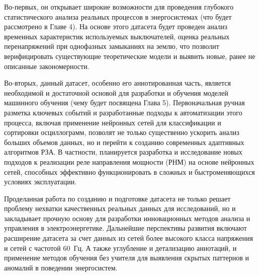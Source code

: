 Во-первых, он открывает широкие возможности для проведения глубокого статистического анализа реальных процессов в энергосистемах (что будет рассмотрено в Главе 4). На основе этого датасета будет проведен анализ временных характеристик используемых выключателей, оценка реальных перенапряжений при однофазных замыканиях на землю, что позволит верифицировать существующие теоретические модели и выявить новые, ранее не описанные закономерности.

Во-вторых, данный датасет, особенно его аннотированная часть, является необходимой и достаточной основой для разработки и обучения моделей машинного обучения (чему будет посвящена Глава 5). Первоначальная ручная разметка ключевых событий и разработанные подходы к автоматизации этого процесса, включая применение нейронных сетей для классификации и сортировки осциллограмм, позволят не только существенно ускорить анализ больших объемов данных, но и перейти к созданию современных адаптивных алгоритмов РЗА. В частности, планируется разработка и исследование новых подходов к реализации реле направления мощности (РНМ) на основе нейронных сетей, способных эффективно функционировать в сложных и быстроменяющихся условиях эксплуатации.

Проделанная работа по созданию и подготовке датасета не только решает проблему нехватки качественных реальных данных для исследований, но и закладывает прочную основу для разработки инновационных методов анализа и управления в электроэнергетике. Дальнейшие перспективы развития включают расширение датасета за счет данных из сетей более высокого класса напряжения и сетей с частотой 60~Гц. А также углубление и детализацию аннотаций, и применение методов обучения без учителя для выявления скрытых паттернов и аномалий в поведении энергосистем.
